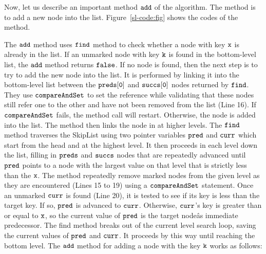 Now, let us describe an important method $\tt add$ of the algorithm. The method is to add a new node into the list.  Figure~\ref{sl-code:fig} shows the codes of the method.





The $\tt add$ method uses $\tt find$ method to check whether a node with key $\tt x$ is already in the list. If an unmarked node with key $\tt k$  is found in the bottom-level list, the $\tt add$ method returns $\tt false$. If no node is found, then the next step is to try to add the new node into the list. It is performed by linking it into the bottom-level list between the $\tt preds[0]$ and $\tt succs[0]$ nodes returned by $\tt find$. They use $\tt compareAndSet$ to set the reference while validating that these nodes still refer one to the other and have not been removed from the list (Line 16). If $\tt compareAndSet$ fails, the method call will restart. Otherwise, the node is added into the list. The method then links the node in at higher levels. The $\tt find$ method traverses the SkipList using two pointer variables $\tt pred$ and $\tt curr$ which start from the head and at the highest level. It then proceeds in each level down the list, filling in $\tt preds$ and $\tt succs$ nodes that are repeatedly advanced until $\tt pred$ points to a node with
the largest value on that level that is strictly less than the $\tt x$. The method repeatedly remove marked nodes from the
given level as they are encountered (Lines 15 to 19) using a $\tt compareAndSet$ statement. Once an unmarked $\tt curr$ is found (Line 20), it is tested to see if its key is less than the target key. If so, $\tt pred$ is advanced to $\tt curr$. Otherwise, $\tt curr$'s key is greater than or equal to $\tt x$, so the current value
of $\tt pred$ is the target nodeâs immediate predecessor. The find method breaks out of the current level search loop, saving the current values of $\tt pred$ and $\tt curr$. It proceeds by this way until reaching the bottom level. The $\tt add$ method for adding a node with the key $\tt k$ works as follows: 
 
